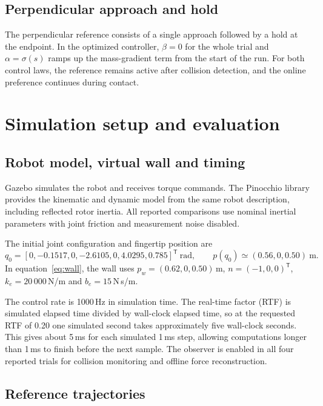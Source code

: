 \documentclass[11pt,a4paper]{article}
\begin{document}
\subsection{Perpendicular approach and hold}
The perpendicular reference consists of a single approach followed by
a hold at the endpoint. In the optimized controller, $\beta=0$ for the
whole trial and $\alpha=\sigma(s)$ ramps up the mass-gradient term from
the start of the run. For both control laws, the reference remains active
after collision detection, and the online preference continues during contact.

\clearpage
\section{Simulation setup and evaluation}
\subsection{Robot model, virtual wall and timing}
Gazebo simulates the robot and receives torque commands. The Pinocchio
library provides the kinematic and dynamic model from the same robot
description, including reflected rotor inertia. All reported comparisons
use nominal inertial parameters with joint friction and measurement noise
disabled.

The initial joint configuration and fingertip position are
\begin{equation}
 q_0=[0,-0.1517,0,-2.6105,0,4.0295,0.785]^{\mathsf T}\ \mathrm{rad},
 \qquad p(q_0)\simeq(0.56,0,0.50)\ \mathrm m .
\end{equation}
In equation~\eqref{eq:wall}, the wall uses
$p_w=(0.62,0,0.50)$\,m, $n=(-1,0,0)^{\mathsf T}$,
$k_e=20\,000$\,N/m and $b_e=15$\,N\,s/m.

The control rate is 1000\,Hz in simulation time. The real-time factor (RTF)
is simulated elapsed time divided by wall-clock elapsed time, so at the
requested RTF of 0.20 one simulated second takes approximately five
wall-clock seconds. This gives about 5\,ms for each simulated 1\,ms step,
allowing computations longer than 1\,ms to finish before the next sample.
The observer is enabled in all four reported trials for collision monitoring
and offline force reconstruction.

\subsection{Reference trajectories}
\end{document}
